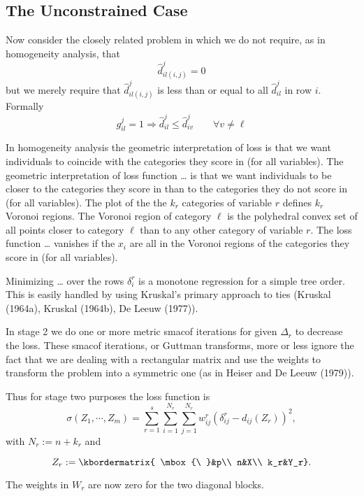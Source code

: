 \documentclass[
  12pt,
]{article}
\begin{document}
\subsection{The Unconstrained Case}\label{the-unconstrained-case}

Now consider the closely related problem in which we do not require,
as in homogeneity analysis, that
\[
\hat d^j_{il(i,j)}=0
\]
but we merely require that \(\hat d^j_{il(i,j)}\) is less than or equal to all
\(\hat d^j_{il}\) in row \(i\). Formally
\[
g^j_{il}=1\Rightarrow\hat d^j_{il}\leq\hat d^j_{iv}\qquad\forall v\not=\ell
\]

In homogeneity analysis the geometric interpretation of loss is that we
want individuals to coincide with the categories they score in (for all variables). The geometric interpretation of loss function \ldots{} is that we want
individuals to be closer to the categories they score in than to the categories
they do not score in (for all variables). The plot of the the \(k_r\) categories of
variable \(r\) defines \(k_r\) Voronoi regions. The Voronoi region of
category \(\ell\) is the polyhedral convex set of all points closer to category
\(\ell\) than to any other category of variable \(r\). The loss function
\ldots{} vanishes if the \(x_i\) are all in the Voronoi regions of the categories
they score in (for all variables).

Minimizing \ldots{} over the rows \(\delta_i^r\) is a monotone regression for a simple tree order. This is easily handled by using Kruskal's primary approach
to ties (Kruskal (1964a), Kruskal (1964b), De Leeuw (1977)).

In stage 2 we do one or more metric smacof iterations for given \(\Delta_r\)
to decrease the loss. These smacof iterations, or Guttman transforms, more or less ignore the fact that we are dealing with a rectangular matrix and use the weights to transform the problem into a symmetric one (as in Heiser and De Leeuw (1979)).

Thus for stage two purposes the loss function is
\[
\sigma(Z_1,\cdots,Z_m)=\sum_{r=1}^s\sum_{i=1}^{N_r}\sum_{j=1}^{N_r}w_{ij}^r(\delta_{ij}^r-d_{ij}(Z_r))^2,
\]
with \(N_r:=n+k_r\) and

\[
Z_r:=\kbordermatrix{
\mbox{\ }&p\\
n&X\\
k_r&Y_r}.
\]

The weights in \(W_r\) are now zero for the two diagonal blocks.
\end{document}
